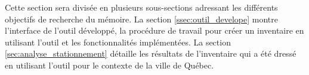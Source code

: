 \label{sec:Resultats}
Cette section sera divisée en plusieurs sous-sections adressant les différents objectifs de recherche du mémoire. La section \ref{ssec:outil_develope} montre l'interface de l'outil développé, la procédure de travail pour créer un inventaire en utilisant l'outil et les fonctionnalités implémentées. La section \ref{sec:analyse_stationnement} détaille les résultats de l'inventaire  qui a été dressé en utilisant l'outil pour le contexte de la ville de Québec. 